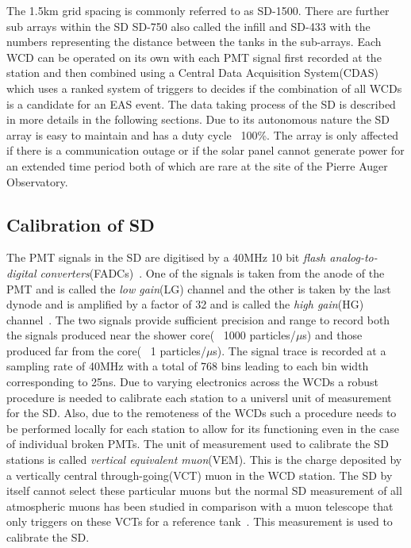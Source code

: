 The 1.5km grid spacing is commonly referred to as SD-1500. There are further sub arrays within the SD SD-750 also called the infill and SD-433 with the numbers representing the distance between the tanks in the sub-arrays. Each WCD can be operated on its own with each PMT signal first recorded at the station and then combined using a Central Data Acquisition System(CDAS)~\cite{} which uses a ranked system of triggers to decides if the combination of all WCDs is a candidate for an EAS event. The data taking process of the SD is described in more details in the following sections. Due to its autonomous nature the SD array is easy to maintain and has a duty cycle ~100\%. The array is only affected if there is a communication outage or if the solar panel cannot generate power for an extended time period both of which are rare at the site of the Pierre Auger Observatory.     

\subsection*{Calibration of SD}
\label{sec:Sur_det_calib}

The PMT signals in the SD are digitised by a 40MHz 10 bit \textit{flash analog-to-digital converters}(FADCs)~\cite{}. One of the signals is taken from the anode of the PMT and is called the \textit{low gain}(LG) channel and the other is taken by the last dynode and is amplified by a factor of 32 and is called the \textit{high gain}(HG) channel~\cite{}. The two signals provide sufficient precision and range to record both the signals produced near the shower core( ~1000 particles/$\mu$s) and those produced far from the core( ~1 particles/$\mu$s). The signal trace is recorded at a sampling rate of 40MHz with a total of 768 bins leading to each bin width corresponding to 25ns. Due to varying electronics across the WCDs a robust procedure is needed to calibrate each station to a universl unit of measurement for the SD. Also, due to the remoteness of the WCDs such a procedure needs to be performed locally for each station to allow for its functioning even in the case of individual broken PMTs. The unit of measurement used to calibrate the SD stations is called \textit{vertical equivalent muon}(VEM). This is the charge deposited by a vertically central through-going(VCT) muon in the WCD station. The SD by itself cannot select these particular muons but the normal SD measurement of all atmospheric muons has been studied in comparison with a muon telescope that only triggers on these VCTs for a reference tank~\cite{}. This measurement is used to calibrate the SD.

